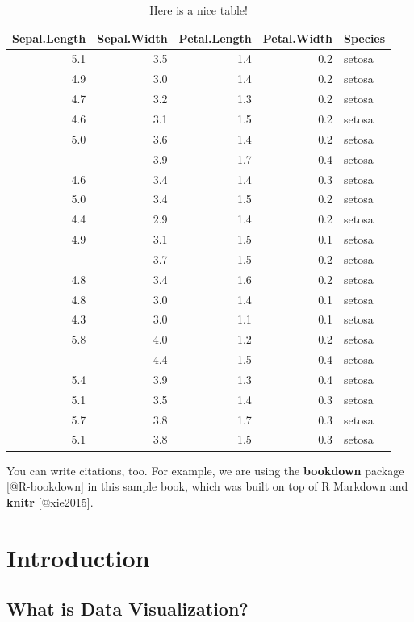 \documentclass[]{book}
\theoremstyle{definition}
\theoremstyle{definition}
\theoremstyle{definition}
\theoremstyle{remark}
\begin{document}
\begin{table}

\caption{\label{tab:nice-tab}Here is a nice table!}
\centering
\begin{tabular}[t]{rrrrl}
\toprule
Sepal.Length & Sepal.Width & Petal.Length & Petal.Width & Species\\
\midrule
5.1 & 3.5 & 1.4 & 0.2 & setosa\\
4.9 & 3.0 & 1.4 & 0.2 & setosa\\
4.7 & 3.2 & 1.3 & 0.2 & setosa\\
4.6 & 3.1 & 1.5 & 0.2 & setosa\\
5.0 & 3.6 & 1.4 & 0.2 & setosa\\
\addlinespace
5.4 & 3.9 & 1.7 & 0.4 & setosa\\
4.6 & 3.4 & 1.4 & 0.3 & setosa\\
5.0 & 3.4 & 1.5 & 0.2 & setosa\\
4.4 & 2.9 & 1.4 & 0.2 & setosa\\
4.9 & 3.1 & 1.5 & 0.1 & setosa\\
\addlinespace
5.4 & 3.7 & 1.5 & 0.2 & setosa\\
4.8 & 3.4 & 1.6 & 0.2 & setosa\\
4.8 & 3.0 & 1.4 & 0.1 & setosa\\
4.3 & 3.0 & 1.1 & 0.1 & setosa\\
5.8 & 4.0 & 1.2 & 0.2 & setosa\\
\addlinespace
5.7 & 4.4 & 1.5 & 0.4 & setosa\\
5.4 & 3.9 & 1.3 & 0.4 & setosa\\
5.1 & 3.5 & 1.4 & 0.3 & setosa\\
5.7 & 3.8 & 1.7 & 0.3 & setosa\\
5.1 & 3.8 & 1.5 & 0.3 & setosa\\
\bottomrule
\end{tabular}
\end{table}

You can write citations, too. For example, we are using the
\textbf{bookdown} package {[}@R-bookdown{]} in this sample book, which
was built on top of R Markdown and \textbf{knitr} {[}@xie2015{]}.

\chapter{Introduction}\label{introduction}

\section{What is Data Visualization?}\label{what-is-data-visualization}
\end{document}
